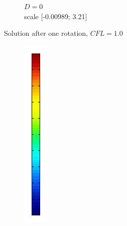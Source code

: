 \documentclass[mathserif]{beamer}
\begin{document}
\begin{frame}
\begin{figure}[H]
\begin{subfigure}[H]{0.3\textwidth}
		\vspace{-3mm}
		\caption{$D = 0$\\\vspace{-2mm}scale [-0.00989; 3.21]}
	\end{subfigure}
	\vspace{-3mm}
	\caption{Solution after one rotation, $CFL = 1.0$}	
\end{figure}
\vspace{-8mm}
\begin{figure}[H]
\centering
	\begin{subfigure}[H]{0.02\textwidth}
		\includegraphics[width=\textwidth]{images/timedep-multiscale/stability/scale.jpg}

\end{subfigure}
\end{figure}
\end{frame}
\end{document}
